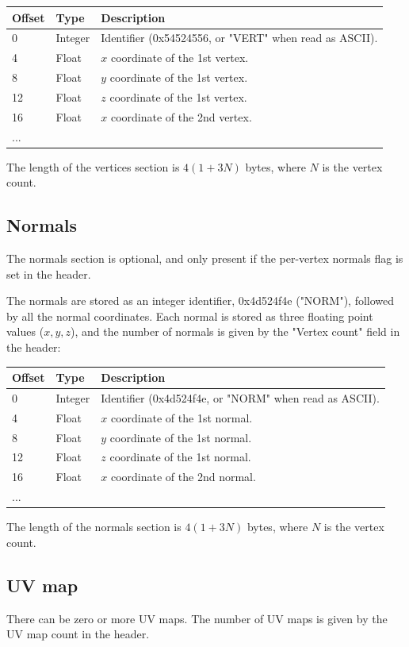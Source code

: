 \begin{tabular}{|l|l|l|}\hline
\textbf{Offset} &  \textbf{Type} & \textbf{Description}\\ \hline
0 & Integer & Identifier (0x54524556, or "VERT" when read as ASCII).\\ \hline
4 & Float & $x$ coordinate of the 1st vertex.\\ \hline
8 & Float & $y$ coordinate of the 1st vertex.\\ \hline
12 & Float & $z$ coordinate of the 1st vertex.\\ \hline
16 & Float & $x$ coordinate of the 2nd vertex.\\ \hline
... & & \\ \hline
\end{tabular}

The length of the vertices section is $4(1+3N)$ bytes, where $N$ is the vertex
count.

\subsection{Normals}
The normals section is optional, and only present if the per-vertex normals
flag is set in the header.

The normals are stored as an integer identifier, 0x4d524f4e ("NORM"), followed
by all the normal coordinates. Each normal is stored as three floating point
values ($x,y,z$), and the number of normals is given by the "Vertex count" field
in the header:

\begin{tabular}{|l|l|l|}\hline
\textbf{Offset} &  \textbf{Type} & \textbf{Description}\\ \hline
0 & Integer & Identifier (0x4d524f4e, or "NORM" when read as ASCII).\\ \hline
4 & Float & $x$ coordinate of the 1st normal.\\ \hline
8 & Float & $y$ coordinate of the 1st normal.\\ \hline
12 & Float & $z$ coordinate of the 1st normal.\\ \hline
16 & Float & $x$ coordinate of the 2nd normal.\\ \hline
... & & \\ \hline
\end{tabular}

The length of the normals section is $4(1+3N)$ bytes, where $N$ is the vertex
count.

\subsection{UV map}
There can be zero or more UV maps. The number of UV maps is given by the
UV map count in the header.

